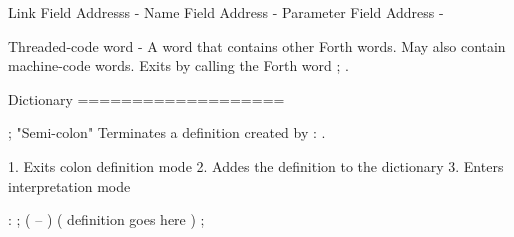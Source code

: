 \documentclass[
    letterpaper, %
	fontsize=10pt, %
	twoside=true, %
	numbers=noenddot, %
]{kaobook}
\begin{document}



\renewcommand{\nomname}{Notation} %
\renewcommand{\nompreamble}{The next list describes several symbols that will be later used within the body of the document.} %

\printnomenclature %





\glsaddall %
\printglossary[title=Glossary, toctitle=Glossary,nonumberlist] %

Link Field Addresss - 
Name Field Address - 
Parameter Field Address - 


Threaded-code word - A word that contains other Forth words. May also 
    contain machine-code words. Exits by calling the Forth word ; .



Dictionary
===================

;  "Semi-colon"
Terminates a definition created by : .

1. Exits colon definition mode
2. Addes the definition to the dictionary
3. Enters interpretation mode

    : ; ( -- )
        ( definition goes here ) ;
\end{document}
